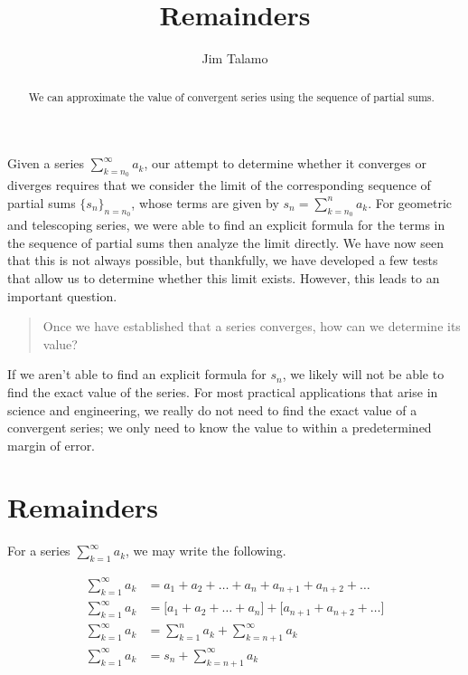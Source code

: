 \documentclass{ximera}
\author{Jim Talamo}
\title[Dig-In:]{Remainders}
\begin{document}
\begin{abstract}
  We can approximate the value of convergent series using the sequence of partial sums.
\end{abstract}
\maketitle

Given a series $\sum_{k=n_0}^{\infty} a_k$, our attempt to determine whether it converges or diverges requires that we consider the limit of the corresponding sequence of partial sums $\{s_n\}_{n = n_0}$, whose terms are given by $s_n = \sum_{k=n_0}^{n}  a_k$.   For geometric and telescoping series, we were able to find an explicit formula for the terms in the sequence of partial sums then analyze the limit directly.  We have now seen that this is not always possible, but thankfully, we have developed a few tests that allow us to determine whether this limit exists.  However, this leads to an important question.

\begin{quote}
Once we have established that a series converges, how can we determine its value?
\end{quote}

If we aren't able to find an explicit formula for $s_n$, we likely will not be able to find the exact value of the series.  For most practical applications that arise in science and engineering,  we really do not need to find the exact value of a convergent series; we only need to know the value to within a predetermined margin of error.


\section{Remainders}

For a series $\sum_{k=1}^{\infty} a_k$, we may write the following.

\begin{align*}
\sum_{k=1}^\infty a_k &= a_1+a_2+\ldots+a_n + a_{n+1} + a_{n+2}+ \ldots\\
\sum_{k=1}^\infty a_k &= \bigg[a_1+a_2+\ldots+a_n\big] + \big[a_{n+1} + a_{n+2}+ \ldots \bigg]\\
\sum_{k=1}^\infty a_k &= \sum_{k=1}^n a_k+\sum_{k=n+1}^\infty a_k \\
\sum_{k=1}^\infty a_k &= s_n+\sum_{k=n+1}^\infty a_k
\end{align*}
\end{document}
